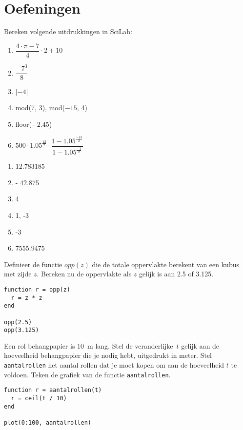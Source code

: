 \section{Oefeningen}
\begin{oef}
   Bereken volgende uitdrukkingen in SciLab: 
\begin{enumerate}
\item  $\dfrac{4\cdot \pi-7}4 \cdot 2+10$
\item $\dfrac{ -7^3}8 $
\item $| - 4| $
\item mod(7, 3), mod($ -15$, 4) 
\item floor($-2.45$) 
\item $500\cdot 1.05^\frac{12}2\cdot \dfrac{1-1.05^\frac{-13}2}{1-1.05^\frac{-1}2} $
\end{enumerate}
   \begin{opl}
\begin{enumerate}
\item  12.783185	
\item - 42.875
\item 4
\item 1, -3 
\item -3
\item 7555.9475
\end{enumerate}
   \end{opl}
\end{oef}

\begin{oef}
Definieer de functie $opp(z)$ die de totale oppervlakte berekent 
van een kubus met zijde $z$. Bereken nu de oppervlakte 
als $z$ gelijk is aan \num{2.5} of \num{3.125}.
\begin{opl}
\begin{lstlisting}
function r = opp(z)
  r = z * z
end

opp(2.5)
opp(3.125)
\end{lstlisting}
\end{opl}
\end{oef}



\begin{oef}
Een rol behangpapier is \SI{10}{\meter} lang. Stel de veranderlijke~$t$
gelijk aan de hoeveelheid behangpapier die je nodig hebt, uitgedrukt in meter.
Stel \verb/aantalrollen/ het aantal rollen dat je moet kopen om aan de
hoeveelheid $t$ te voldoen. Teken de grafiek van de functie \verb/aantalrollen/.
\begin{opl}
\begin{lstlisting}
function r = aantalrollen(t)
  r = ceil(t / 10)
end

plot(0:100, aantalrollen)
\end{lstlisting}
\end{opl}
\end{oef}


